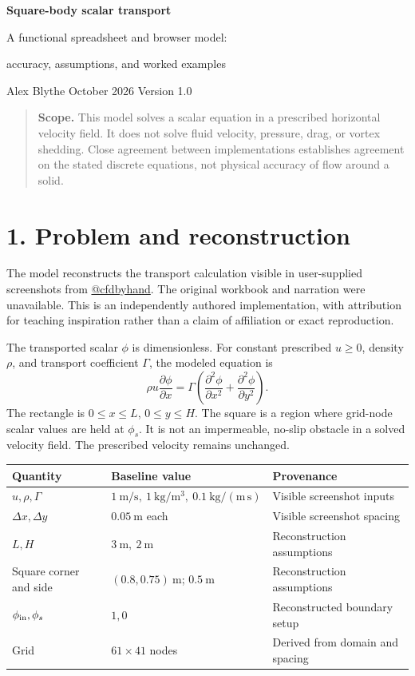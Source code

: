 \documentclass[11pt,letterpaper]{article}
\newcommand{\note}[1]{\begin{quote}\small\textbf{Scope.} #1\end{quote}}
\begin{document}
\begin{center}
{\LARGE\bfseries Square-body scalar transport}\par\vspace{5pt}
{\large A functional spreadsheet and browser model:\par accuracy, assumptions, and worked examples}\par\vspace{8pt}
Alex Blythe  October 2026 \quad Version 1.0
\end{center}
\note{This model solves a scalar equation in a prescribed horizontal velocity field. It does not solve fluid velocity, pressure, drag, or vortex shedding. Close agreement between implementations establishes agreement on the stated discrete equations, not physical accuracy of flow around a solid.}

\section*{1. Problem and reconstruction}
The model reconstructs the transport calculation visible in user-supplied screenshots from \href{https://www.instagram.com/cfdbyhand/}{@cfdbyhand}. The original workbook and narration were unavailable. This is an independently authored implementation, with attribution for teaching inspiration rather than a claim of affiliation or exact reproduction.

The transported scalar $\phi$ is dimensionless. For constant prescribed $u\geq0$, density $\rho$, and transport coefficient $\Gamma$, the modeled equation is
\begin{equation}
\rho u\frac{\partial\phi}{\partial x}
=\Gamma\left(\frac{\partial^2\phi}{\partial x^2}+\frac{\partial^2\phi}{\partial y^2}\right).
\label{eq:pde}
\end{equation}
The rectangle is $0\leq x\leq L$, $0\leq y\leq H$. The square is a region where grid-node scalar values are held at $\phi_s$. It is not an impermeable, no-slip obstacle in a solved velocity field. The prescribed velocity remains unchanged.

\begin{center}\small
\begin{tabular}{lll}
\toprule Quantity & Baseline value & Provenance \\\midrule
$u,\rho,\Gamma$ & $1\ \mathrm{m/s},\ 1\ \mathrm{kg/m^3},\ 0.1\ \mathrm{kg/(m\,s)}$ & Visible screenshot inputs \\
$\Delta x,\Delta y$ & $0.05\ \mathrm{m}$ each & Visible screenshot spacing \\
$L,H$ & $3\ \mathrm{m},\ 2\ \mathrm{m}$ & Reconstruction assumptions \\
Square corner and side & $(0.8,0.75)\ \mathrm{m}$; $0.5\ \mathrm{m}$ & Reconstruction assumptions \\
$\phi_{\rm in},\phi_s$ & $1,0$ & Reconstructed boundary setup \\
Grid & $61\times41$ nodes & Derived from domain and spacing \\
\bottomrule
\end{tabular}
\end{center}
\end{document}
